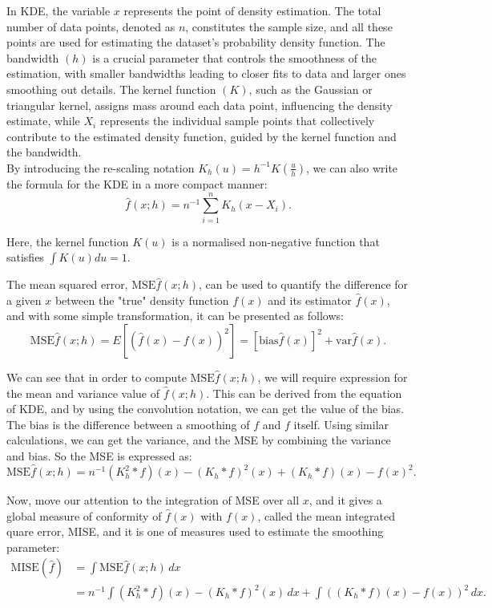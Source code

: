 \documentclass{article}\usepackage[]{graphicx}\usepackage[]{xcolor}
\numberwithin{equation}{section}
\begin{document}
\noindent
In KDE, the variable $x$ represents the point of density estimation. The total number of data points, denoted as $n$, constitutes the sample size, and all these points are used for estimating the dataset's probability density function. The bandwidth $(h)$ is a crucial parameter that controls the smoothness of the estimation, with smaller bandwidths leading to closer fits to data and larger ones smoothing out details. The kernel function $(K)$, such as the Gaussian or triangular kernel, assigns mass around each data point, influencing the density estimate, while $X_i$ represents the individual sample points that collectively contribute to the estimated density function, guided by the kernel function and the bandwidth\cite{wand1994kernel}.\\

\noindent
By introducing the re-scaling notation $K_h(u) = h^{-1}K(\frac{u}{h})$, we can also write the formula for the KDE in a more compact manner:
$$\hat{f}(x; h) = n^{-1} \sum_{i=1}^{n} K_h(x - X_i).$$

\noindent
Here, the kernel function \( K(u) \) is a normalised non-negative function that satisfies $\int K(u) du = 1.$

\noindent
The mean squared error, $\text{MSE}{\hat{f}(x;h)}$, can be used to quantify the difference for a given $x$ between the "true" density function $f(x)$ and its estimator $\hat{f}(x)$, and with some simple transformation, it can be presented as follows:
$$\text{MSE}{\hat{f}(x;h)}=E[(\hat{f}(x)-f(x))^2]=[\text{bias}\hat{f}(x)]^2+\text{var}\hat{f}(x).$$

\noindent
We can see that in order to compute $\text{MSE}{\hat{f}(x;h)}$, we will require expression for the mean and variance value of $\hat{f}(x;h)$. This can be derived from the equation of KDE, and by using the convolution notation, we can get the value of the bias. The bias is the difference between a smoothing of $f$ and $f$ itself. Using similar calculations, we can get the variance, and the MSE by combining the variance and bias. So the MSE is expressed as: 
$$\text{MSE}{\hat{f}(x;h)}=n^{-1}{(K_h^2 \ast f)(x)-(K_h \ast f)^2(x)}+{(K_h \ast f)(x)-f(x)}^2.$$

\noindent
Now, move our attention to the integration of MSE over all $x$, and it gives a global measure of conformity of $\hat{f}(x)$ with $f(x)$, called the mean integrated quare error, MISE, and it is one of measures used to estimate the smoothing parameter:
\begin{align*}
\text{MISE}(\hat{f}) &= \int \text{MSE} \hat{f}(x; h) \, dx \\
&= n^{-1} \int (K_h^2 * f)(x) - (K_h * f)^2(x) \, dx + \int ((K_h * f)(x) - f(x))^2 \, dx.
\end{align*}
\end{document}
